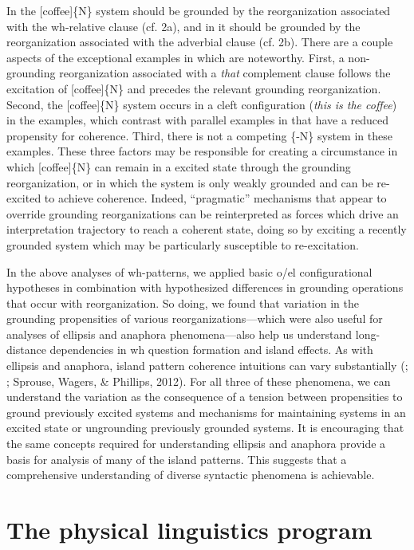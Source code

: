 In  the [coffee]\{N\} system should be grounded by the reorganization associated with the wh-relative clause (cf. 2a), and in  it should be grounded by the reorganization associated with the adverbial clause (cf. 2b). There are a couple aspects of the exceptional examples in  which are noteworthy. First, a non-grounding reorganization associated with a \textit{that} complement clause follows the excitation of [coffee]\{N\} and precedes the relevant grounding reorganization. Second, the [coffee]\{N\} system occurs in a cleft configuration (\textit{this is the coffee}) in the  examples, which contrast with parallel examples in  that have a reduced propensity for coherence. Third, there is not a competing \{-N\} system in these examples. These three factors may be responsible for creating a circumstance in which [coffee]\{N\} can remain in a excited state through the grounding reorganization, or in which the system is only weakly grounded and can be re-excited to achieve coherence. Indeed, “pragmatic” mechanisms that appear to override grounding reorganizations can be reinterpreted as forces which drive an interpretation trajectory to reach a coherent state, doing so by exciting a recently grounded system which may be particularly susceptible to re-excitation.

In the above analyses of wh-patterns, we applied basic o/el configurational hypotheses in combination with hypothesized differences in grounding operations that occur with reorganization. So doing, we found that variation in the grounding propensities of various reorganizations—which were also useful for analyses of ellipsis and anaphora phenomena—also help us understand long-distance dependencies in wh question formation and island effects. As with ellipsis and anaphora, island pattern coherence intuitions can vary substantially (\citealt{Kluender1998}; \citealt{SprouseHornstein2013}; Sprouse, Wagers, \& Phillips, 2012). For all three of these phenomena, we can understand the variation as the consequence of a tension between propensities to ground previously excited systems and mechanisms for maintaining systems in an excited state or ungrounding previously grounded systems. It is encouraging that the same concepts required for understanding ellipsis and anaphora provide a basis for analysis of many of the island patterns. This suggests that a comprehensive understanding of diverse syntactic phenomena is achievable.

\chapter{The physical linguistics program}

